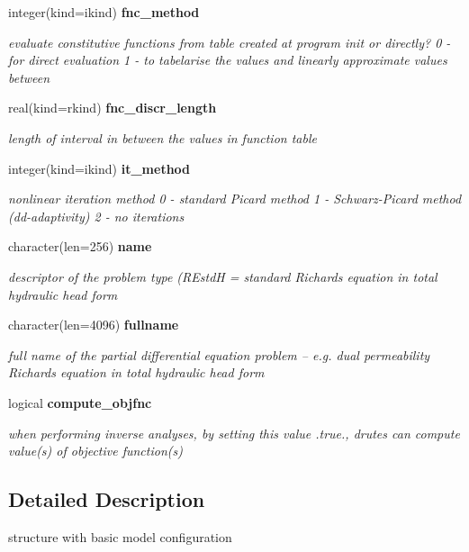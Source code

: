 \begin{DoxyCompactItemize}
integer(kind=ikind) {\bf fnc\+\_\+method}
\begin{DoxyCompactList}\small\item\em evaluate constitutive functions from table created at program init or directly? 0 -\/ for direct evaluation 1 -\/ to tabelarise the values and linearly approximate values between \end{DoxyCompactList}\item 
real(kind=rkind) {\bf fnc\+\_\+discr\+\_\+length}
\begin{DoxyCompactList}\small\item\em length of interval in between the values in function table \end{DoxyCompactList}\item 
integer(kind=ikind) {\bf it\+\_\+method}
\begin{DoxyCompactList}\small\item\em nonlinear iteration method 0 -\/ standard Picard method 1 -\/ Schwarz-\/\+Picard method (dd-\/adaptivity) 2 -\/ no iterations \end{DoxyCompactList}\item 
character(len=256) {\bf name}
\begin{DoxyCompactList}\small\item\em descriptor of the problem type (R\+EstdH = standard Richards equation in total hydraulic head form \end{DoxyCompactList}\item 
character(len=4096) {\bf fullname}
\begin{DoxyCompactList}\small\item\em full name of the partial differential equation problem -- e.\+g. dual permeability Richards equation in total hydraulic head form \end{DoxyCompactList}\item 
logical {\bf compute\+\_\+objfnc}
\begin{DoxyCompactList}\small\item\em when performing inverse analyses, by setting this value .true., drutes can compute value(s) of objective function(s) \end{DoxyCompactList}\end{DoxyCompactItemize}


\subsection{Detailed Description}
structure with basic model configuration 

